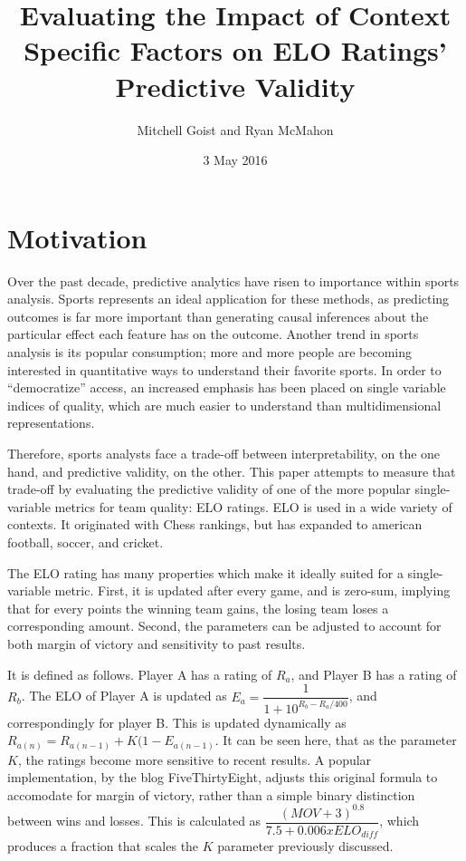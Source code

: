 \documentclass[12pt]{article}
\title{Evaluating the Impact of Context Specific Factors on ELO Ratings' Predictive Validity}
\author{Mitchell Goist and Ryan McMahon}
\date{3 May 2016}
\begin{document}
\maketitle

\doublespacing
\section{Motivation}

Over the past decade, predictive analytics have risen to importance within sports analysis. Sports represents an ideal application for these methods, as predicting outcomes is far more important than generating causal inferences about the particular effect each feature has on the outcome. Another trend in sports analysis is its popular consumption; more and more people are becoming interested in quantitative ways to understand their favorite sports. In order to ``democratize'' access, an increased emphasis has been placed on single variable indices of quality, which are much easier to understand than multidimensional representations.

Therefore, sports analysts face a trade-off between interpretability, on the one hand, and predictive validity, on the other. This paper attempts to measure that trade-off by evaluating the predictive validity of one of the more popular single-variable metrics for team quality: ELO ratings. ELO is used in a wide variety of contexts. It originated with Chess rankings, but has expanded to american football, soccer, and cricket. 

The ELO rating has many properties which make it ideally suited for a single-variable metric. First, it is updated after every game, and is zero-sum, implying that for every points the winning team gains, the losing team loses a corresponding amount. Second, the parameters can be adjusted to account for both margin of victory and sensitivity to past results.

It is defined as follows. Player A has a rating of $R_{a}$, and Player B has a rating of $R_{b}$. The ELO of Player A is updated as $E_{a} = \dfrac{1}{1+10^{R_{b}-R_{a}/400}}$, and correspondingly for player B. This is updated dynamically as $R_{a(n)} = R_{a(n-1)} + K(1-E_{a(n-1)}$. It can be seen here, that as the parameter $K$, the ratings become more sensitive to recent results. A popular implementation, by the blog FiveThirtyEight, adjusts this original formula to accomodate for margin of victory, rather than a simple binary distinction between wins and losses. This is calculated as $\dfrac{(MOV + 3)^{0.8}}{7.5 + 0.006 x ELO_{diff}}$, which produces a fraction that scales the $K$ parameter previously discussed.
\end{document}
